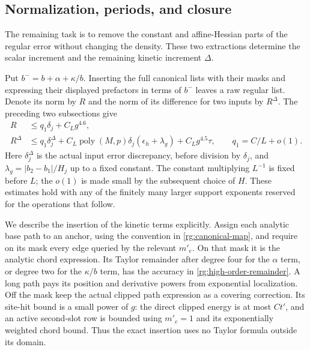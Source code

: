 \subsection{Normalization, periods, and closure}
\label{rg:normalization}

The remaining task is to remove the constant and affine-Hessian parts
of the regular error without changing the density. These two extractions
determine the scalar increment and the remaining kinetic increment
$\Delta$.

Put $b^-=b+\alpha+\kappa/b$.  Inserting the full canonical lists
with their masks and expressing their displayed prefactors in terms
of $b^-$ leaves a raw regular list.  Denote its norm by $R$ and the
norm of its difference for two inputs by $R^\Delta$.  The preceding
two subsections give
\begin{align}
 R&\le q_1\delta_j+C_Lg^{4.6},\nonumber\\
 R^\Delta&\le q_1\delta_j^\Delta+
 C_L\operatorname{poly}(M,p)\delta_j(\epsilon_h+\lambda_g)
       +C_Lg^{4.5}\tau,
 \qquad q_1=C/L+o(1).
 \label{rg:raw-error}
\end{align}
Here $\delta_j^\Delta$ is the actual input error discrepancy, before
division by $\delta_j$, and $\lambda_g=|b_2-b_1|/H_j$ up to a fixed
constant.  The constant multiplying $L^{-1}$ is fixed before $L$;
the $o(1)$ is made small by the subsequent choice of $H$.
These estimates hold with any of the finitely many larger support
exponents reserved for the operations that follow.

We describe the insertion of the kinetic terms explicitly.  Assign
each analytic base path to an anchor, using the convention in
\eqref{rg:canonical-map}, and require on its mask every edge queried
by the relevant $m'_e$.  On that mask it is the analytic chord
expression.  Its Taylor remainder after degree four for the
$\alpha$ term, or degree two for the $\kappa/b$ term, has the
accuracy in \eqref{rg:high-order-remainder}.  A long path pays its
position and derivative powers from exponential localization.
Off the mask keep the actual clipped path expression as a covering
correction.  Its site-hit bound is a small power of $g$: the direct
clipped energy is at most $Ct'$, and an active second-slot row is
bounded using $m'_e=1$ and its exponentially weighted chord bound.
Thus the exact insertion uses no Taylor formula outside its domain.

